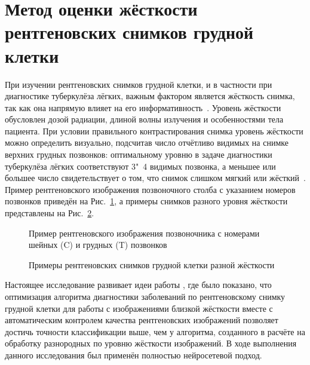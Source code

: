 \section{Метод оценки жёсткости рентгеновских снимков грудной клетки}

При изучении рентгеновских снимков грудной клетки, и в частности при диагностике туберкулёза лёгких, важным фактором является жёсткость снимка, так как она напрямую влияет на его информативность~\cite{chuiko1982effects, тимофеева2013основные}. Уровень жёсткости обусловлен дозой радиации, длиной волны излучения и особенностями тела пациента. При условии правильного контрастирования снимка уровень жёсткости можно определить визуально, подсчитав число отчётливо видимых на снимке верхних грудных позвонков: оптимальному уровню в задаче диагностики туберкулёза лёгких соответствуют 3"~4 видимых позвонка, а меньшее или большее число свидетельствует о том, что снимок слишком мягкий или жёсткий~\cite{тимофеева2013основные, сидоров2012методика}. Пример рентгеновского изображения позвоночного столба с указанием номеров позвонков приведён на Рис.~\ref{fig:vertebral-column}, а примеры снимков разного уровня жёсткости представлены на Рис.~\ref{fig:samples-different-hardness}.

\begin{figure}[ht]
	\caption{Пример рентгеновского изображения позвоночника с номерами шейных (C) и грудных (T) позвонков}
	\label{fig:vertebral-column}
\end{figure}

\begin{figure}[ht]
	\caption{Примеры рентгеновских снимков грудной клетки разной жёсткости}
	\label{fig:samples-different-hardness}
\end{figure}

Настоящее исследование развивает идеи работы \cite{dovganich2022automatic}, где было показано, что оптимизация алгоритма диагностики заболеваний по рентгеновскому снимку грудной клетки для работы с изображениями близкой жёсткости вместе с автоматическим контролем качества рентгеновских изображений позволяет достичь точности классификации выше, чем у алгоритма, созданного в расчёте на обработку разнородных по уровню жёсткости изображений. В ходе выполнения данного исследования был применён полностью нейросетевой подход.

